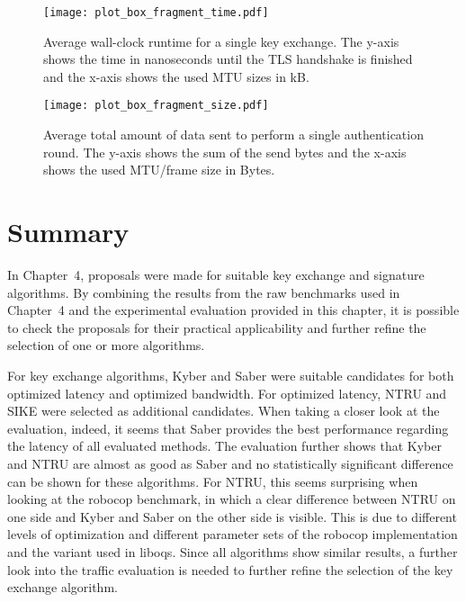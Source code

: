 \begin{figure}[t]
    \centering\texttt{[image: plot\_box\_fragment\_time.pdf]}
    \caption{Average wall-clock runtime for a single key exchange. The y-axis shows the time in nanoseconds until the TLS handshake is finished and the x-axis shows the used MTU sizes in kB.}\label{fig:plot_box_fragment_time.pdf}
\end{figure}
\begin{figure}[t]
    \centering\texttt{[image: plot\_box\_fragment\_size.pdf]}
    \caption{Average total amount of data sent to perform a single authentication round. The y-axis shows the sum of the send bytes and the x-axis shows the used MTU/frame size in Bytes.}\label{fig:plot_box_fragment_size.pdf}
\end{figure}

\section{Summary}

In Chapter~4, proposals were made for suitable key exchange and signature algorithms. By combining the results from the raw benchmarks used in Chapter~4 and the experimental evaluation provided in this chapter, it is possible to check the proposals for their practical applicability and further refine the selection of one or more algorithms.

For key exchange algorithms, Kyber and Saber were suitable candidates for both optimized latency and optimized bandwidth. For optimized latency, NTRU and SIKE were selected as additional candidates. When taking a closer look at the evaluation, indeed, it seems that Saber provides the best performance regarding the latency of all evaluated methods. The evaluation further shows that Kyber and NTRU are almost as good as Saber and no statistically significant difference can be shown for these algorithms. For NTRU, this seems surprising when looking at the robocop benchmark, in which a clear difference between NTRU on one side and Kyber and Saber on the other side is visible. This is due to different levels of optimization and different parameter sets of the robocop implementation and the variant used in liboqs. Since all algorithms show similar results, a further look into the traffic evaluation is needed to further refine the selection of the key exchange algorithm. 


